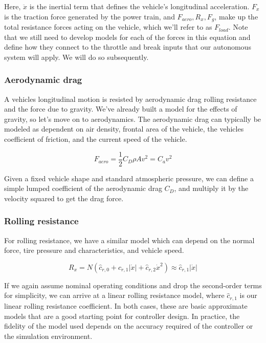  Here, $\ddot{x}$ is the inertial term that defines the vehicle's longitudinal acceleration. 
$F_x$ is the traction force generated by the power train, and $F_{aero}, R_x, F_g$, make up the total resistance forces acting on the vehicle, which we'll refer to as $F_{load}$. Note that we still need to develop models for each of the forces in this equation and define how they connect to the throttle and break inputs that our autonomous system will apply. We will do so subsequently.

\subsubsection{Aerodynamic drag}

A vehicles longitudinal motion is resisted by aerodynamic drag rolling resistance and the force due to gravity. We've already built a model for the effects of gravity, so let's move on to aerodynamics. The aerodynamic drag can typically be modeled as dependent on air density, frontal area of the vehicle, the vehicles coefficient of friction, and the current speed of the vehicle. 

\begin{equation}
F_{aero} = \frac{1}{2} C_D \rho A v^2 = C_{a} v^2
\end{equation}

Given a fixed vehicle shape and standard atmospheric pressure, we can define a simple lumped coefficient of the aerodynamic drag $C_D$, and multiply it by the velocity squared to get the drag force. 

\subsubsection{Rolling resistance}

For rolling resistance, we have a similar model which can depend on the normal force, tire pressure and characteristics, and vehicle speed. 

\begin{equation}
R_x = N(\hat{c}_{r,0} + \hat{c}_{r,1}|\dot{x}| + \hat{c}_{r,2} \dot{x}^2) \approx \hat{c}_{r,1}|\dot{x}| 
\end{equation}

If we again assume nominal operating conditions and drop the second-order terms for simplicity, we can arrive at a linear rolling resistance model, where $\hat{c}_{r,1}$ is our linear rolling resistance coefficient. In both cases, these are basic approximate models that are a good starting point for controller design. In practice, the fidelity of the model used depends on the accuracy required of the controller or the simulation environment. 


